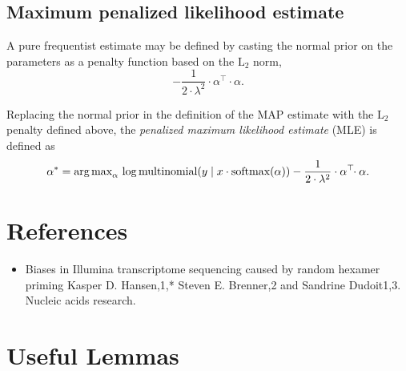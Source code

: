 \documentclass[11pt]{article}
\begin{document}
\subsection{Maximum penalized likelihood estimate}

A pure frequentist estimate may be defined by casting the normal prior
on the parameters as a penalty function based on the $\textrm{L}_2$
norm,
\[
  -\frac{1}{2 \cdot \lambda^2} \cdot \alpha^{\top}\!\! \cdot \alpha.
\]

Replacing the normal prior in the definition of the MAP estimate with
the $\textrm{L}_2$ penalty defined above, the
\emph{penalized maximum likelihood estimate} (MLE) is defined as
\[
  \alpha^* = \textrm{arg\,max}_{\alpha} \,
  \log \textrm{multinomial}(y \mid x \cdot \textrm{softmax}(\alpha))
  - \frac{1}{2 \cdot \lambda^2} \cdot \alpha^{\top}\!\! \cdot \alpha.
\]


\section*{References}

\begin{itemize}
\item Biases in Illumina transcriptome sequencing caused by random
  hexamer priming Kasper D. Hansen,1,* Steven E. Brenner,2 and
  Sandrine Dudoit1,3.  Nucleic acids research.
\end{itemize}


\appendix

\section{Useful Lemmas}
\end{document}
